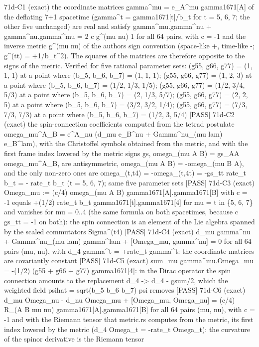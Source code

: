 \documentclass[
  10pt,
]{article}
\newenvironment{Shaded}{}{}
\newcommand{\NormalTok}[1]{#1}
\begin{document}
\begin{Shaded}
\begin{Highlighting}[]
\NormalTok{[PASS] 71d{-}C1  (exact) the coordinate matrices gamma\^{}mu = e\_A\^{}mu gamma1671[A] of the deflating 7+1 spacetime (gamma\^{}t = gamma1671[t]/b\_t for t = 5, 6, 7; the other five unchanged) are real and satisfy gamma\^{}mu.gamma\^{}nu + gamma\^{}nu.gamma\^{}mu = 2 c g\^{}(mu nu) 1 for all 64 pairs, with c = {-}1 and the inverse metric g\^{}(mu nu) of the author\textquotesingle{}s sign convention (space{-}like +, time{-}like {-}; g\^{}(tt) = +1/b\_t\^{}2). The squares of the matrices are therefore opposite to the signs of the metric. Verified for five rational parameter sets: (g55, g66, g77) = (1, 1, 1) at a point where (b\_5, b\_6, b\_7) = (1, 1, 1); (g55, g66, g77) = (1, 2, 3) at a point where (b\_5, b\_6, b\_7) = (1/2, 1/3, 1/5); (g55, g66, g77) = (1/2, 3/4, 5/3) at a point where (b\_5, b\_6, b\_7) = (2, 1/3, 5/7); (g55, g66, g77) = (2, 2, 5) at a point where (b\_5, b\_6, b\_7) = (3/2, 3/2, 1/4); (g55, g66, g77) = (7/3, 7/3, 7/3) at a point where (b\_5, b\_6, b\_7) = (1/2, 3, 5/4)}
\NormalTok{[PASS] 71d{-}C2  (exact) the spin{-}connection coefficients computed from the tetrad postulate omega\_mu\^{}A\_B = e\^{}A\_nu (d\_mu e\_B\^{}nu + Gamma\^{}nu\_(mu lam) e\_B\^{}lam), with the Christoffel symbols obtained from the metric, and with the first frame index lowered by the metric signs gs, omega\_(mu A B) = gs\_AA omega\_mu\^{}A\_B, are antisymmetric, omega\_(mu A B) = {-}omega\_(mu B A), and the only non{-}zero ones are omega\_(t,t4) = {-}omega\_(t,4t) = {-}gs\_tt rate\_t b\_t = {-} rate\_t b\_t (t = 5, 6, 7); same five parameter sets}
\NormalTok{[PASS] 71d{-}C3  (exact) Omega\_mu := (c/4) omega\_(mu A B) gamma1671[A].gamma1671[B] with c = {-}1 equals +(1/2) rate\_t b\_t gamma1671[t].gamma1671[4] for mu = t in \{5, 6, 7\} and vanishes for mu = 0..4 (the same formula on both spacetimes, because c gs\_tt = {-}1 on both): the spin connection is an element of the Lie algebra spanned by the scaled commutators Sigma\^{}(t4)}
\NormalTok{[PASS] 71d{-}C4  (exact) d\_mu gamma\^{}nu + Gamma\^{}nu\_(mu lam) gamma\^{}lam + [Omega\_mu, gamma\^{}nu] = 0 for all 64 pairs (mu, nu), with d\_4 gamma\^{}t = +rate\_t gamma\^{}t: the coordinate matrices are covariantly constant}
\NormalTok{[PASS] 71d{-}C5  (exact) sum\_mu gamma\^{}mu.Omega\_mu = {-}(1/2) (g55 + g66 + g77) gamma1671[4]: in the Dirac operator the spin connection amounts to the replacement d\_4 {-}\textgreater{} d\_4 {-} gsum/2, which the weighted field psihat = sqrt(b\_5 b\_6 b\_7) psi removes}
\NormalTok{[PASS] 71d{-}C6  (exact) d\_mu Omega\_nu {-} d\_nu Omega\_mu + [Omega\_mu, Omega\_nu] = (c/4) R\_(A B mu nu) gamma1671[A].gamma1671[B] for all 64 pairs (mu, nu), with c = {-}1 and with the Riemann tensor that metric.rs computes from the metric, its first index lowered by the metric (d\_4 Omega\_t = {-}rate\_t Omega\_t): the curvature of the spinor derivative is the Riemann tensor}

\end{Highlighting}
\end{Shaded}
\end{document}
